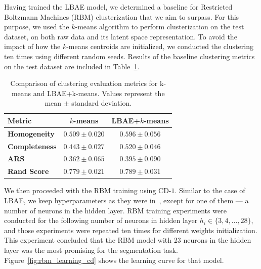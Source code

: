 \documentclass[runningheads]{llncs}
\begin{document}
Having trained the LBAE model, we determined a baseline for Restricted Boltzmann
Machines (RBM) clusterization that we aim to surpass. For this purpose, we used
the $k$-means algorithm to perform clusterization on the test dataset, on both
raw data and its latent space representation. To avoid the impact of how the
$k$-means centroids are initialized, we conducted the clustering ten times using
different random seeds. Results of the baseline clustering metrics on the test
dataset are included in
Table~\ref{tab:baseline_kmeans_clustering_on_test_dataset}.
\begin{table}
    \centering
    \caption[Comparison of baseline clustering evaluation metrics for k-means and LBAE+k-means.]{Comparison of clustering evaluation metrics for k-means and LBAE+k-means. Values represent the mean $\pm$ standard deviation.}
    \begin{tabular}{@{} lc c @{} }
        \toprule
        \textbf{Metric} & \textbf{$k$-means} & \textbf{LBAE+$k$-means} \\
        \midrule
        \textbf{Homogeneity} & $0.509 \pm 0.020$ & $0.596 \pm 0.056$ \\
        \textbf{Completeness} & $0.443 \pm 0.027$ & $0.520 \pm 0.046$ \\
        \textbf{ARS} & $0.362 \pm 0.065$ & $0.395 \pm 0.090$ \\
        \textbf{Rand Score} & $0.779 \pm 0.021$ & $0.789 \pm 0.031$ \\
        \bottomrule
    \end{tabular}
    \label{tab:baseline_kmeans_clustering_on_test_dataset}
\end{table}

We then proceeded with the RBM training using CD-$1$. Similar to the case of
LBAE, we keep hyperparameters as they were in~\cite{QBM4EO}, except for one of
them --- a number of neurons in the hidden layer. RBM training experiments were
conducted for the following number of neurons in hidden layer $h_i \in \{3, 4,
\ldots, 28\}$, and those experiments were repeated ten times for different
weights initialization. This experiment concluded that the RBM model with 23
neurons in the hidden layer was the most promising for the segmentation task.
Figure~\ref{fig:rbm_learning_cd} shows the learning curve for that model.

\end{document}
